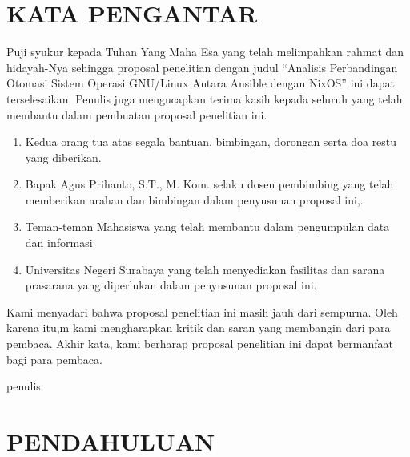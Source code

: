 \documentclass[10pt,]{report}
\begin{document}

\chapter*{KATA PENGANTAR}
\begin{justify}
	Puji syukur kepada Tuhan Yang Maha Esa yang telah melimpahkan rahmat dan
	hidayah-Nya sehingga proposal penelitian dengan judul “Analisis Perbandingan
	Otomasi Sistem Operasi GNU/Linux Antara Ansible dengan NixOS” ini
	dapat terselesaikan. Penulis juga mengucapkan terima kasih kepada seluruh
	yang telah membantu dalam pembuatan proposal penelitian ini.
	\begin{enumerate}[leftmargin=0.45cm]
		\item Kedua orang tua atas segala bantuan, bimbingan, dorongan serta doa restu yang diberikan.
		\item Bapak Agus Prihanto, S.T., M. Kom. selaku dosen pembimbing yang telah memberikan arahan dan bimbingan dalam penyusunan proposal ini,.
		\item Teman-teman Mahasiswa yang telah membantu dalam pengumpulan data dan informasi
		\item Universitas Negeri Surabaya yang telah menyediakan fasilitas dan sarana prasarana yang diperlukan dalam penyusunan proposal ini.
	\end{enumerate}
	Kami menyadari bahwa proposal penelitian ini masih jauh dari sempurna. Oleh karena itu,m kami mengharapkan kritik dan saran yang membangin dari para pembaca.
	Akhir kata, kami berharap proposal penelitian ini dapat bermanfaat bagi para pembaca.
\end{justify}
\begin{FlushRight}
	penulis
\end{FlushRight}
\tableofcontents
\newpage
\chapter{PENDAHULUAN}
\end{document}
